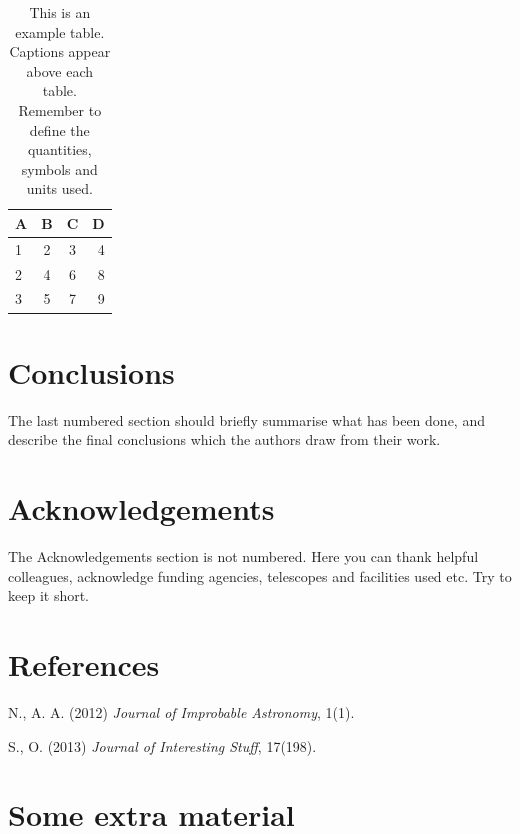 \documentclass[a4paper,fleqn,usenatbib]{mnras}
\begin{document}
\begin{table}
  \centering
  \caption{This is an example table. Captions appear above each table.
  Remember to define the quantities, symbols and units used.}
  \label{tab:example_table}
  \begin{tabular}{lccr} %
    \hline
    A & B & C & D\\
    \hline
    1 & 2 & 3 & 4\\
    2 & 4 & 6 & 8\\
    3 & 5 & 7 & 9\\
    \hline
  \end{tabular}
\end{table}

\hypertarget{conclusions}{%
\section{Conclusions}\label{conclusions}}

The last numbered section should briefly summarise what has been done,
and describe the final conclusions which the authors draw from their
work.

\hypertarget{acknowledgements}{%
\section*{Acknowledgements}\label{acknowledgements}}

The Acknowledgements section is not numbered. Here you can thank helpful
colleagues, acknowledge funding agencies, telescopes and facilities used
etc. Try to keep it short.

\hypertarget{references}{%
\section*{References}\label{references}}

\hypertarget{refs}{}
\leavevmode\hypertarget{ref-Author2012}{}%
N., A. A. (2012) \emph{Journal of Improbable Astronomy}, 1(1).

\leavevmode\hypertarget{ref-Others2013}{}%
S., O. (2013) \emph{Journal of Interesting Stuff}, 17(198).

\appendix

\hypertarget{some-extra-material}{%
\section{Some extra material}\label{some-extra-material}}
\end{document}
